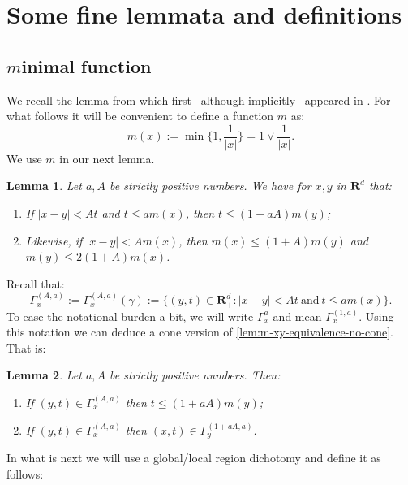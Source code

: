 \documentclass[a4paper,oneside,10pt]{amsproc}
\theoremstyle{plain}
\newtheorem{lemma}{Lemma}
\theoremstyle{remark}
\theoremstyle{definition}
\renewcommand{\leq}{\leqslant}
\renewcommand{\leq}{\leqslant}
\newcommand{\R}{\mathbf R}
\renewcommand{\leq}{\leqslant}%
\begin{document}
\section{Some fine lemmata and definitions}
\subsection{$m$inimal function}
We recall the lemma from \cite[lemma 2.3]{Maas2011b} which first
--although implicitly-- appeared in \cite{Mauceri2007}. For what
follows it will be convenient to define a function $m$ as:
\begin{equation*}
  m(x) := \min\biggl\{1, \frac1{|x|} \biggr\} = 1 \vee \frac1{|x|}.
\end{equation*}
We use $m$ in our next lemma.
\begin{lemma}\label{lem:m-xy-equivalence-no-cone}
  Let $a, A$ be strictly positive numbers. We have for $x, y$
  in $\R^d$ that:
  \begin{enumerate}
  \item If $|x - y| < A t$ and $t \leq a m(x)$, then $t
    \leq (1 + aA) m(y)$;
  \item Likewise, if $|x - y| < A m(x)$, then $m(x) \leq (1 +
    A) m(y)$ and $m(y) \leq 2 (1 + A) m(x)$. 
  \end{enumerate}
\end{lemma}
Recall that:
\begin{equation}
  \label{eq:Gaussian-cone}
  \Gamma_x^{(A, a)} := \Gamma_x^{(A, a)}(\gamma) := \{(y, t) \in
  \R^d_+ : |x - y| < At \:\text{and}\: t \leq a m(x)\}.
\end{equation}
To ease the notational burden a bit, we will write $\Gamma_x^a$ and
mean $\Gamma_x^{(1, a)}$. Using this notation we can deduce a cone
version of \autoref{lem:m-xy-equivalence-no-cone}. That is:
\begin{lemma}\label{lem:m-xy-equivalence}
  Let $a, A$ be strictly positive numbers. Then:
  \begin{enumerate}
  \item If $(y, t) \in \Gamma_x^{(A, a)}$ then $t \leq (1 + aA) m(y)$;
  \item If $(y, t) \in \Gamma_x^{(A, a)}$ then  $(x, t) \in
    \Gamma_y^{(1 + aA, a)}$.
  \end{enumerate}
\end{lemma}
In what is next we will use a global/local region dichotomy and define
it as follows:
\end{document}
